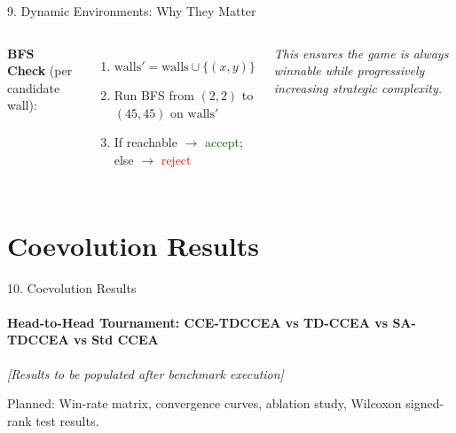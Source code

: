 \documentclass[aspectratio=169, 11pt]{beamer}
\begin{document}
\begin{frame}{9. Dynamic Environments: Why They Matter}
\begin{columns}[T]
        \vspace{0.15cm}
        {\scriptsize
        \textbf{BFS Check} (per candidate wall):
        \begin{enumerate}\scriptsize
            \item $\text{walls}' = \text{walls} \cup \{(x,y)\}$
            \item Run BFS from $(2,2)$ to $(45,45)$ on $\text{walls}'$
            \item If reachable $\rightarrow$ \textcolor{darkGreen}{accept}; else $\rightarrow$ \textcolor{red}{reject}
        \end{enumerate}
        }

        \vspace{0.1cm}
        {\scriptsize \textit{This ensures the game is always winnable while progressively increasing strategic complexity.}}
    \end{columns}
\end{frame}

\section{Coevolution Results}
\begin{frame}{10. Coevolution Results}
    \framesubtitle{Head-to-Head Tournament: CCE-TDCCEA vs TD-CCEA vs SA-TDCCEA vs Std CCEA}

    \vspace{1.5cm}
    \centering
    {\Large \textit{\textcolor{medGray}{[Results to be populated after benchmark execution]}}}
    \vspace{0.5cm}

    {\footnotesize Planned: Win-rate matrix, convergence curves, ablation study, Wilcoxon signed-rank test results.}
\end{frame}

\end{document}
